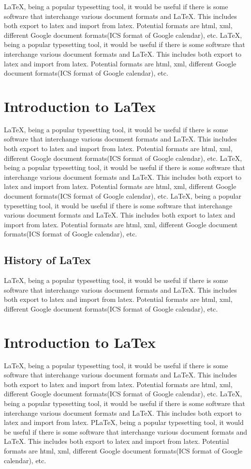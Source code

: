 \documentclass[a4paper,10pt]{mesreport}
\begin{document}
LaTeX, being a popular typesetting tool, it would be useful if there is some software that interchange
various document formats and LaTeX. This includes both export to latex and import from latex.
Potential formats are html, xml, different Google document formats(ICS format of Google calendar), etc.
LaTeX, being a popular typesetting tool, it would be useful if there is some software that interchange
various document formats and LaTeX. This includes both export to latex and import from latex.
Potential formats are html, xml, different Google document formats(ICS format of Google calendar), etc.

\section{Introduction to LaTex}
LaTeX, being a popular typesetting tool, it would be useful if there is some software that interchange
various document formats and LaTeX. This includes both export to latex and import from latex.
Potential formats are html, xml, different Google document formats(ICS format of Google calendar), etc.
LaTeX, being a popular typesetting tool, it would be useful if there is some software that interchange
various document formats and LaTeX. This includes both export to latex and import from latex.
Potential formats are html, xml, different Google document formats(ICS format of Google calendar), etc.
LaTeX, being a popular typesetting tool, it would be useful if there is some software that interchange
various document formats and LaTeX. This includes both export to latex and import from latex.
Potential formats are html, xml, different Google document formats(ICS format of Google calendar), etc.

\subsection{History of LaTex}

LaTeX, being a popular typesetting tool, it would be useful if there is some software that interchange
various document formats and LaTeX. This includes both export to latex and import from latex.
Potential formats are html, xml, different Google document formats(ICS format of Google calendar), etc.

\section{Introduction to LaTex}
LaTeX, being a popular typesetting tool, it would be useful if there is some software that interchange
various document formats and LaTeX. This includes both export to latex and import from latex.
Potential formats are html, xml, different Google document formats(ICS format of Google calendar), etc.
LaTeX, being a popular typesetting tool, it would be useful if there is some software that interchange
various document formats and LaTeX. This includes both export to latex and import from latex.
PLaTeX, being a popular typesetting tool, it would be useful if there is some software that interchange
various document formats and LaTeX. This includes both export to latex and import from latex.
Potential formats are html, xml, different Google document formats(ICS format of Google calendar), etc.
\end{document}
